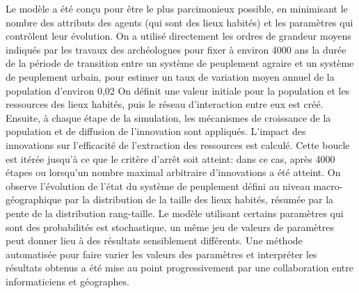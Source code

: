 \documentclass[10pt]{article}
\begin{document}
Le modèle a été conçu pour être le plus parcimonieux possible, en minimisant le nombre des attributs des agents (qui sont des lieux habités) et les paramètres qui contrôlent leur évolution. On a utilisé directement les ordres de grandeur moyens indiqués par les travaux des archéologues pour fixer à environ 4000 ans la durée de la période de transition entre un système de peuplement agraire et un système de peuplement urbain, pour estimer un taux de variation moyen annuel de la population d’environ 0,02%
On définit une valeur initiale pour la population et les ressources des lieux habités, puis le réseau d’interaction entre eux est créé. Ensuite, à chaque étape de la simulation, les mécanismes de croissance de la population et de diffusion de l'innovation sont appliqués. L’impact des innovations sur l’efficacité de l’extraction des ressources est calculé. Cette boucle est itérée jusqu'à ce que le critère d'arrêt soit atteint: dans ce cas, après 4000 étapes ou lorsqu’un nombre maximal arbitraire d'innovations a été atteint. On observe l’évolution de l’état du système de peuplement défini au niveau macro-géographique par la distribution de la taille des lieux habités, résumée par la pente de la distribution rang-taille. Le modèle utilisant certains paramètres qui sont des probabilités est stochastique, un même jeu de valeurs de paramètres peut donner lieu à des résultats sensiblement différents. Une méthode automatisée pour faire varier les valeurs des paramètres et interpréter les résultats obtenus a été mise au point progressivement par une collaboration entre informaticiens et géographes.
\end{document}
